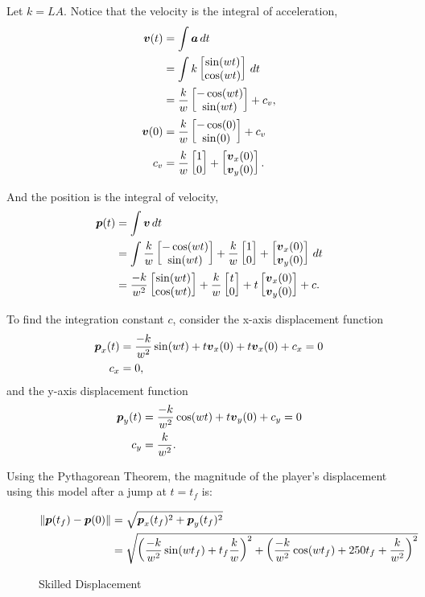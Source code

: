 Let $k=LA$. Notice that the velocity is the integral of acceleration,
\begin{align*}
    \boldsymbol{v}(t) &= \int \boldsymbol{a} \, dt\\
    &= \int k \begin{bmatrix}\sin(wt)\\\cos(wt) \end{bmatrix} \, dt\\
    &= \frac{k}{w} \begin{bmatrix}-\cos(wt)\\\sin(wt) \end{bmatrix} + c_v,\\
    \boldsymbol{v}(0) &= \frac{k}{w} \begin{bmatrix}-\cos(0)\\\sin(0) \end{bmatrix} + c_v\\
    c_v &= \frac{k}{w} \begin{bmatrix}1\\0 \end{bmatrix} + \begin{bmatrix}\boldsymbol{v}_x(0)\\\boldsymbol{v}_y(0) \end{bmatrix}.
\end{align*}

And the position is the integral of velocity,
\begin{align*}
    \boldsymbol{p}(t) &= \int \boldsymbol{v} \, dt\\
    &= \int \frac{k}{w} \begin{bmatrix}-\cos(wt)\\\sin(wt) \end{bmatrix} + \frac{k}{w}\begin{bmatrix}1\\0 \end{bmatrix} + \begin{bmatrix}\boldsymbol{v}_x(0)\\\boldsymbol{v}_y(0) \end{bmatrix} \, dt\\
    &= \frac{-k}{w^2} \begin{bmatrix}\sin(wt)\\\cos(wt) \end{bmatrix} + \frac{k}{w}\begin{bmatrix}t\\0 \end{bmatrix}  + t\begin{bmatrix}\boldsymbol{v}_x(0)\\\boldsymbol{v}_y(0) \end{bmatrix} + c.
\end{align*}

To find the integration constant $c$, consider the x-axis displacement function
\begin{align*}
    \boldsymbol{p}_x(t) &= \frac{-k}{w^2} \sin(wt) + t\boldsymbol{v}_x(0) + t\boldsymbol{v}_x(0) + c_x = 0\\
    c_x &= 0,
\end{align*}
and the y-axis displacement function
\begin{align*}
    \boldsymbol{p}_y(t) &= \frac{-k}{w^2} \cos(wt) + t\boldsymbol{v}_y(0) + c_y = 0\\
    c_y &= \frac{k}{w^2}.
\end{align*}

Using the Pythagorean Theorem, the magnitude of the player's displacement using this model after a jump at $t=t_f$ is:
\begin{figure}[H]
    \centering
    \begin{align*}
        \|\boldsymbol{p}(t_f) - \boldsymbol{p}(0)\| &= \sqrt{\boldsymbol{p}_x(t_f)^2 + \boldsymbol{p}_y(t_f)^2}\\
        &= \sqrt{\left(\frac{-k}{w^2}\sin(wt_f) + t_f\frac{k}{w} \right)^2 + \left( \frac{-k}{w^2}\cos(wt_f) + 250t_f + \frac{k}{w^2} \right)^2}
    \end{align*}
    \caption{Skilled Displacement}
    \label{eq:2skilled_displacement}

\end{figure}

